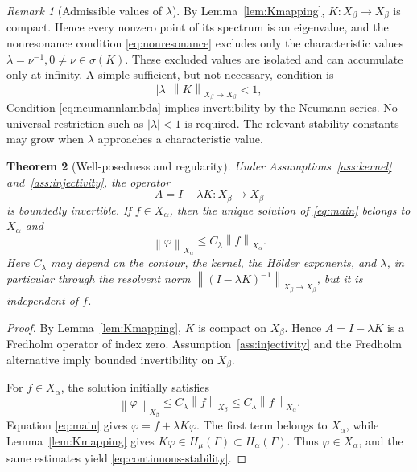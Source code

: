 \documentclass[11pt,a4paper]{amsart}
\theoremstyle{plain}
\newtheorem{theorem}{Theorem}[section]
\theoremstyle{definition}
\theoremstyle{remark}
\newtheorem{remark}[theorem]{Remark}
\newcommand{\Ga}{\Gamma}
\newcommand{\norm}[1]{\left\|#1\right\|}
\begin{document}
\begin{remark}[Admissible values of $\lambda$]\label{rem:lambda}
By Lemma~\ref{lem:Kmapping}, $K:X_\beta\to X_\beta$ is compact.  Hence every nonzero point of its spectrum is an eigenvalue, and the nonresonance condition \eqref{eq:nonresonance} excludes only the characteristic values
$
        \lambda=\nu^{-1},
         0\ne\nu\in\sigma(K).
$
These excluded values are isolated and can accumulate only at infinity.  A simple sufficient, but not necessary, condition is
\begin{equation}\label{eq:neumannlambda}
        |\lambda|\,\norm{K}_{X_\beta\to X_\beta}<1,
\end{equation}
Condition \eqref{eq:neumannlambda} implies invertibility by the Neumann series.  No universal restriction such as $|\lambda|<1$ is required.  The relevant stability constants may grow when $\lambda$ approaches a characteristic value.
\end{remark}

\begin{theorem}[Well-posedness and regularity]\label{thm:wellposed}
Under Assumptions~\ref{ass:kernel} and~\ref{ass:injectivity}, the operator
\[
        A=I-\lambda K:X_\beta\to X_\beta
\]
is boundedly invertible.  If $f\in X_\alpha$, then the unique solution of \eqref{eq:main} belongs to $X_\alpha$ and
\begin{equation}\label{eq:continuous-stability}
        \norm{\varphi}_{X_\alpha}
        \le C_\lambda\norm{f}_{X_\alpha}.
\end{equation}
Here $C_\lambda$ may depend on the contour, the kernel, the H\"older exponents, and $\lambda$, in particular through the resolvent norm
$\norm{(I-\lambda K)^{-1}}_{X_\beta\to X_\beta}$, but it is independent of $f$.
\end{theorem}

\begin{proof}
By Lemma~\ref{lem:Kmapping}, $K$ is compact on $X_\beta$.  Hence $A=I-\lambda K$ is a Fredholm operator of index zero.  Assumption~\ref{ass:injectivity} and the Fredholm alternative imply bounded invertibility on $X_\beta$.

For $f\in X_\alpha$, the solution initially satisfies
\[
        \norm{\varphi}_{X_\beta}
        \le C_\lambda\norm{f}_{X_\beta}
        \le C_\lambda\norm{f}_{X_\alpha}.
\]
Equation \eqref{eq:main} gives
$
        \varphi=f+\lambda K\varphi.
$
The first term belongs to $X_\alpha$, while Lemma~\ref{lem:Kmapping} gives $K\varphi\in H_\mu(\Ga)\subset H_\alpha(\Ga)$.  Thus $\varphi\in X_\alpha$, and the same estimates yield \eqref{eq:continuous-stability}.
\end{proof}
\end{document}
